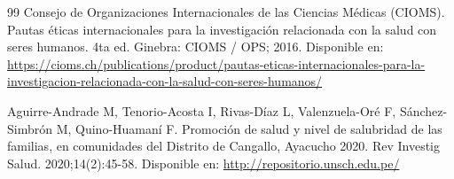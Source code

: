 \begin{thebibliography}{99}
Consejo de Organizaciones Internacionales de las Ciencias Médicas (CIOMS). Pautas éticas internacionales para la investigación relacionada con la salud con seres humanos. 4ta ed. Ginebra: CIOMS / OPS; 2016. Disponible en: \url{https://cioms.ch/publications/product/pautas-eticas-internacionales-para-la-investigacion-relacionada-con-la-salud-con-seres-humanos/}

Aguirre-Andrade M, Tenorio-Acosta I, Rivas-Díaz L, Valenzuela-Oré F, Sánchez-Simbrón M, Quino-Huamaní F. Promoción de salud y nivel de salubridad de las familias, en comunidades del Distrito de Cangallo, Ayacucho 2020. Rev Investig Salud. 2020;14(2):45-58. Disponible en: \url{http://repositorio.unsch.edu.pe/}

\end{thebibliography}

\newpage
